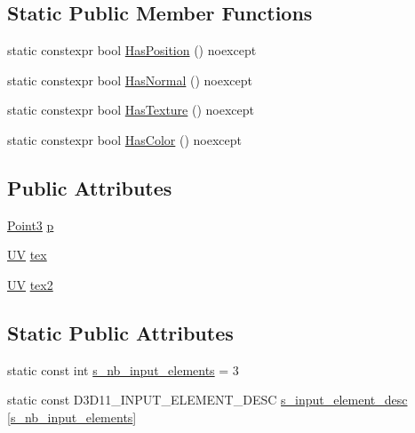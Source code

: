 \subsection*{Static Public Member Functions}
\begin{DoxyCompactItemize}
\item 
static constexpr bool \hyperlink{structmage_1_1_vertex_position_texture_texture_ae89995d8e461d3ee461cd55ce214c749}{Has\+Position} () noexcept
\item 
static constexpr bool \hyperlink{structmage_1_1_vertex_position_texture_texture_ae61b4c7a1b5efeb6894c910202f8b246}{Has\+Normal} () noexcept
\item 
static constexpr bool \hyperlink{structmage_1_1_vertex_position_texture_texture_ad43aac95c2d0c120e2e5120553c4eadc}{Has\+Texture} () noexcept
\item 
static constexpr bool \hyperlink{structmage_1_1_vertex_position_texture_texture_a7909db2966b9c3bab061a4bd22868019}{Has\+Color} () noexcept
\end{DoxyCompactItemize}
\subsection*{Public Attributes}
\begin{DoxyCompactItemize}
\item 
\hyperlink{structmage_1_1_point3}{Point3} \hyperlink{structmage_1_1_vertex_position_texture_texture_aed106149eda65a20e60ebc3b93535270}{p}
\item 
\hyperlink{structmage_1_1_u_v}{UV} \hyperlink{structmage_1_1_vertex_position_texture_texture_ae47656414d503a2c96c88fa6d485cccf}{tex}
\item 
\hyperlink{structmage_1_1_u_v}{UV} \hyperlink{structmage_1_1_vertex_position_texture_texture_a5a41669f18385d932c1490ff20c80bed}{tex2}
\end{DoxyCompactItemize}
\subsection*{Static Public Attributes}
\begin{DoxyCompactItemize}
\item 
static const int \hyperlink{structmage_1_1_vertex_position_texture_texture_a587a9f30fb21d84ff8c3291c4d2ea9ac}{s\+\_\+nb\+\_\+input\+\_\+elements} = 3
\item 
static const D3\+D11\+\_\+\+I\+N\+P\+U\+T\+\_\+\+E\+L\+E\+M\+E\+N\+T\+\_\+\+D\+E\+SC \hyperlink{structmage_1_1_vertex_position_texture_texture_aa3d92b247687789245ed11e719ba2421}{s\+\_\+input\+\_\+element\+\_\+desc} \mbox{[}\hyperlink{structmage_1_1_vertex_position_texture_texture_a587a9f30fb21d84ff8c3291c4d2ea9ac}{s\+\_\+nb\+\_\+input\+\_\+elements}\mbox{]}
\end{DoxyCompactItemize}



